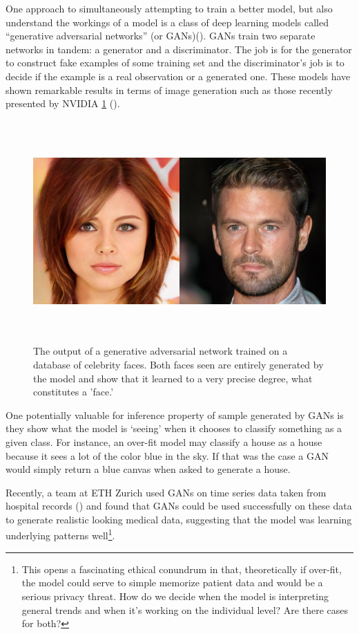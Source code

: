 \documentclass[]{book}
\let\rmarkdownfootnote\footnote%
\def\footnote{\protect\rmarkdownfootnote}
\theoremstyle{definition}
\theoremstyle{definition}
\theoremstyle{definition}
\theoremstyle{remark}
\begin{document}
One approach to simultaneously attempting to train a better model, but
also understand the workings of a model is a class of deep learning
models called ``generative adversarial networks'' (or
GANs)(\citet{gans}). GANs train two separate networks in tandem: a
generator and a discriminator. The job is for the generator to construct
fake examples of some training set and the discriminator's job is to
decide if the example is a real observation or a generated one. These
models have shown remarkable results in terms of image generation such
as those recently presented by NVIDIA \ref{fig:ganexample}
(\citet{progressive_gans}).

\begin{figure}
\includegraphics[height=320]{figures/gan_example} \caption{The output of a generative adversarial network trained on a database of celebrity faces. Both faces seen are entirely generated by the model and show that it learned to a very precise degree, what constitutes a 'face.'}\label{fig:ganexample}
\end{figure}

One potentially valuable for inference property of sample generated by
GANs is they show what the model is `seeing' when it chooses to classify
something as a given class. For instance, an over-fit model may classify
a house as a house because it sees a lot of the color blue in the sky.
If that was the case a GAN would simply return a blue canvas when asked
to generate a house.

Recently, a team at ETH Zurich used GANs on time series data taken from
hospital records (\citet{medical_gans}) and found that GANs could be
used successfully on these data to generate realistic looking medical
data, suggesting that the model was learning underlying patterns
well\footnote{This opens a fascinating ethical conundrum in that,
  theoretically if over-fit, the model could serve to simple memorize
  patient data and would be a serious privacy threat. How do we decide
  when the model is interpreting general trends and when it's working on
  the individual level? Are there cases for both?}.
\end{document}
